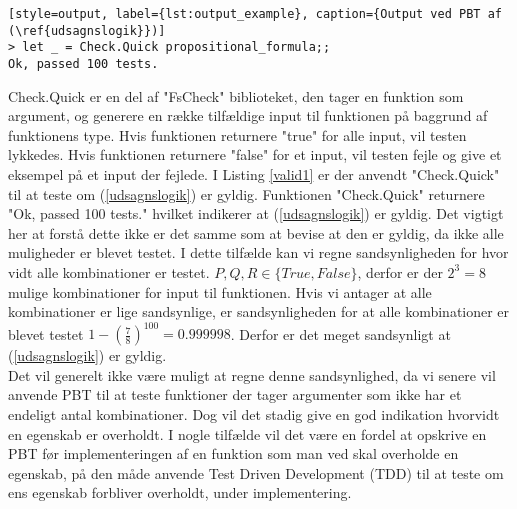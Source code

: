 \begin{lstlisting}[style=output, label={lst:output_example}, caption={Output ved PBT af (\ref{udsagnslogik}})]
> let _ = Check.Quick propositional_formula;;
Ok, passed 100 tests.
\end{lstlisting}

Check.Quick er en del af "FsCheck" biblioteket, den tager en funktion som argument, og generere en række tilfældige input til funktionen på baggrund af funktionens type. Hvis funktionen returnere "true" for alle input, vil testen lykkedes. Hvis funktionen returnere "false" for et input, vil testen fejle og give et eksempel på et input der fejlede. I Listing \ref{valid1} er der anvendt "Check.Quick" til at teste om (\ref{udsagnslogik}) er gyldig. Funktionen "Check.Quick" returnere "Ok, passed 100 tests." hvilket indikerer at (\ref{udsagnslogik}) er gyldig. Det vigtigt her at forstå dette ikke er det samme som at bevise at den er gyldig, da ikke alle muligheder er blevet testet. I dette tilfælde kan vi regne sandsynligheden for hvor vidt alle kombinationer er testet. $P, Q, R \in \{True, False\}$, derfor er der $2^3 = 8$ mulige kombinationer for input til funktionen. Hvis vi antager at alle kombinationer er lige sandsynlige, er sandsynligheden for at alle kombinationer er blevet testet $1 - (\frac{7}{8})^{100} = 0.999998$. Derfor er det meget sandsynligt at (\ref{udsagnslogik}) er gyldig.\\
Det vil generelt ikke være muligt at regne denne sandsynlighed, da vi senere vil anvende PBT til at teste funktioner der tager argumenter som ikke har et endeligt antal kombinationer. Dog vil det stadig give en god indikation hvorvidt en egenskab er overholdt. I nogle tilfælde vil det være en fordel at opskrive en PBT før implementeringen af en funktion som man ved skal overholde en egenskab, på den måde anvende Test Driven Development (TDD)  til at teste om ens egenskab forbliver overholdt, under implementering.
